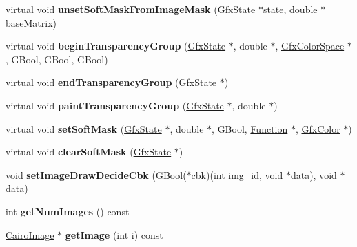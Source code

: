 \begin{DoxyCompactItemize}
\item 
\mbox{\label{class_cairo_image_output_dev_ad64addb235202cbca2897865ca9b80d7}} 
virtual void {\bfseries unset\+Soft\+Mask\+From\+Image\+Mask} (\hyperlink{class_gfx_state}{Gfx\+State} $\ast$state, double $\ast$base\+Matrix)
\item 
\mbox{\label{class_cairo_image_output_dev_a20c6d536fadb4b422e2b7241927af600}} 
virtual void {\bfseries begin\+Transparency\+Group} (\hyperlink{class_gfx_state}{Gfx\+State} $\ast$, double $\ast$, \hyperlink{class_gfx_color_space}{Gfx\+Color\+Space} $\ast$, G\+Bool, G\+Bool, G\+Bool)
\item 
\mbox{\label{class_cairo_image_output_dev_a9765d45249cd0f1fd8a8cdedb5ef0bdb}} 
virtual void {\bfseries end\+Transparency\+Group} (\hyperlink{class_gfx_state}{Gfx\+State} $\ast$)
\item 
\mbox{\label{class_cairo_image_output_dev_a9fc559e270d983b8604a0e2efa1451bc}} 
virtual void {\bfseries paint\+Transparency\+Group} (\hyperlink{class_gfx_state}{Gfx\+State} $\ast$, double $\ast$)
\item 
\mbox{\label{class_cairo_image_output_dev_a0fdd2611271f3cfc1d22d3efdfd7d663}} 
virtual void {\bfseries set\+Soft\+Mask} (\hyperlink{class_gfx_state}{Gfx\+State} $\ast$, double $\ast$, G\+Bool, \hyperlink{class_function}{Function} $\ast$, \hyperlink{struct_gfx_color}{Gfx\+Color} $\ast$)
\item 
\mbox{\label{class_cairo_image_output_dev_a11854d3d873dd5b415f1a5a2636978fd}} 
virtual void {\bfseries clear\+Soft\+Mask} (\hyperlink{class_gfx_state}{Gfx\+State} $\ast$)
\item 
\mbox{\label{class_cairo_image_output_dev_a002375f5dd8fa1aaa39dabca4ba215ec}} 
void {\bfseries set\+Image\+Draw\+Decide\+Cbk} (G\+Bool($\ast$cbk)(int img\+\_\+id, void $\ast$data), void $\ast$data)
\item 
\mbox{\label{class_cairo_image_output_dev_a9cbe50b56d67ee047f1551cf9bdf87df}} 
int {\bfseries get\+Num\+Images} () const
\item 
\mbox{\label{class_cairo_image_output_dev_a2558e985c72f1229b7aa7c3683292e8d}} 
\hyperlink{class_cairo_image}{Cairo\+Image} $\ast$ {\bfseries get\+Image} (int i) const
\end{DoxyCompactItemize}
